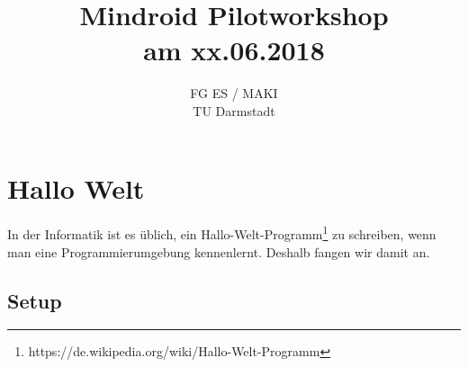 \documentclass[
	12pt,
	article,
	type=bsc, %
	colorbacktitle,
	instlogo,
	accentcolor=tud1c,
	german,
	twoside
]{tudexercise}
\begin{document}
  \author{}
	
\title{Mindroid Pilotworkshop \\ am xx.06.2018}
	
\subtitle{FG ES / MAKI \\ TU Darmstadt}
\subsubtitle{}
	
\maketitle
	
\newpage
	
\tableofcontents 

\newpage
	
	
	
	\section{Hallo Welt}
	In der Informatik ist es üblich, ein Hallo-Welt-Programm\footnote{https://de.wikipedia.org/wiki/Hallo-Welt-Programm} zu schreiben, wenn man eine Programmierumgebung kennenlernt. Deshalb fangen wir damit an. 
	
\subsection{Setup}
\end{document}
